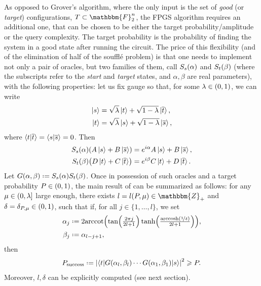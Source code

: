\documentclass[reqno, 12pt]{amsart}
\numberwithin{equation}{section}                %
\let\originalleft\left
\let\originalright\right
\renewcommand{\left}{\mathopen{}\mathclose\bgroup\originalleft}
\renewcommand{\right}{\aftergroup\egroup\originalright}
\def\({\mathopen{}\left(}
\def\){\right)\mathclose{}}
\newcommand*{\eqdef}{\mathrel{\vcenter{\baselineskip0.5ex \lineskiplimit0pt\hbox{.}\hbox{.}}}=}
\def\F{\mathbbm{F}}
\def\Z{\mathbbm{Z}}
\begin{document}
As opposed to Grover's algorithm, where the only input is the set of \emph{good} (or \emph{target}) configurations, $T \subset \F_2^n$, the FPGS algorithm requires an additional one, that can be chosen to be either the target probability/amplitude or the query complexity. The target probability is the probability of finding the system in a good state after running the circuit. The price of this flexibility (and of the elimination of half of the souffl\'e problem) is that one needs to implement not only a pair of oracles, but two families of them, call $S_s \( \alpha \)$ and $S_t \( \beta \)$ (where the subscripts refer to the \emph{start} and \emph{target} states, and $\alpha, \beta$ are real parameters), with the following properties: let us fix gauge so that, for some $\lambda \in \( 0, 1 \)$, we can write
\begin{align}
   \ket{s}  &= \sqrt{\lambda} \ket{t} + \sqrt{1 - \lambda} \ket{\overline{t}}, \\
   \ket{t}  &= \sqrt{\lambda} \ket{s} + \sqrt{1 - \lambda} \ket{\overline{s}},
\end{align}
where $\braket{t | \overline{t}} = \braket{s | \overline{s}} = 0$. Then
\begin{align}
   S_s \( \alpha \) \( A \ket{s} + B \ket{\overline{s}} \)  &= e^{i \alpha} A \ket{s} + B \ket{\overline{s}}, \\
   S_t \( \beta \) \( D \ket{t} + C \ket{\overline{t}} \)   &= e^{i \beta} C \ket{t} + D \ket{\overline{t}}.
\end{align}
Let $G \( \alpha, \beta \) \eqdef S_s \( \alpha \) S_t \( \beta \)$. Once in possession of such oracles and a target probability $P \in \( 0, 1 \)$, the main result of \cite{yoder_fixed_2014} can be summarized as follows: for any $\mu \in \( 0, \lambda \right]$ large enough, there exists $l = l \( P, \mu \) \in \Z_+$ and $\delta = \delta_{P, \mu} \in \( 0, 1 \)$, such that if, for all $j \in \{ 1, \ldots, l \}$, we set
\begin{align}
   \alpha_j &\eqdef 2 \mathrm{arccot} \( \tan \( \tfrac{2 \pi j}{2 l + 1} \) \tanh \( \tfrac{\mathrm{arccosh} \( \nicefrac{1}{\delta} \)}{2 l + 1} \) \), \\
   \beta_j  &\eqdef \alpha_{l - j + 1},
\end{align}
then
\begin{equation}
   P_{\mathrm{success}} \eqdef \left| \left\langle t \middle| G \( \alpha_l, \beta_l \) \cdots G \( \alpha_1, \beta_1 \) \middle| s \right\rangle \right|^2 \geqslant P.
\end{equation}
Moreover, $l, \delta$ can be explicitly computed (see next section).
\end{document}
